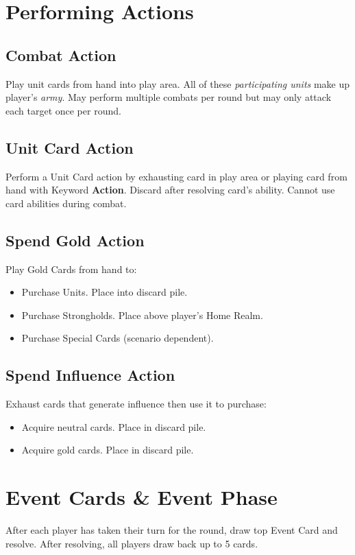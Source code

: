 \documentclass[12pt]{article}
\newenvironment{itemizeCustom}
{\begin{itemize}
  \setlength{\itemsep}{1pt}
  \setlength{\parskip}{0pt}
  \setlength{\parsep}{0pt}}
{\end{itemize}}
\begin{document}
\begin{multicols*}{2}
\section*{Performing Actions}
\subsection*{Combat Action}
Play unit cards from hand into play area. All of these \emph{participating units} make up player's \emph{army}. May perform multiple combats per round but may only attack each target once per round.

\subsection*{Unit Card Action}
Perform a Unit Card action by exhausting card in play area or playing card from hand with Keyword \textbf{Action}. Discard after resolving card's ability. Cannot use card abilities during combat.

\subsection*{Spend Gold Action}
Play Gold Cards from hand to:
\begin{itemizeCustom}
    \item Purchase Units. Place into discard pile.
    \item Purchase Strongholds. Place above player's Home Realm.
    \item Purchase Special Cards (scenario dependent).
\end{itemizeCustom}

\subsection*{Spend Influence Action}
Exhaust cards that generate influence then use it to purchase:
\begin{itemizeCustom}
    \item Acquire neutral cards. Place in discard pile.
    \item Acquire gold cards. Place in discard pile.
\end{itemizeCustom}

\section*{Event Cards \& Event Phase}
After each player has taken their turn for the round, draw top Event Card and resolve. After resolving, all players draw back up to 5 cards.


\end{multicols*}
\end{document}
